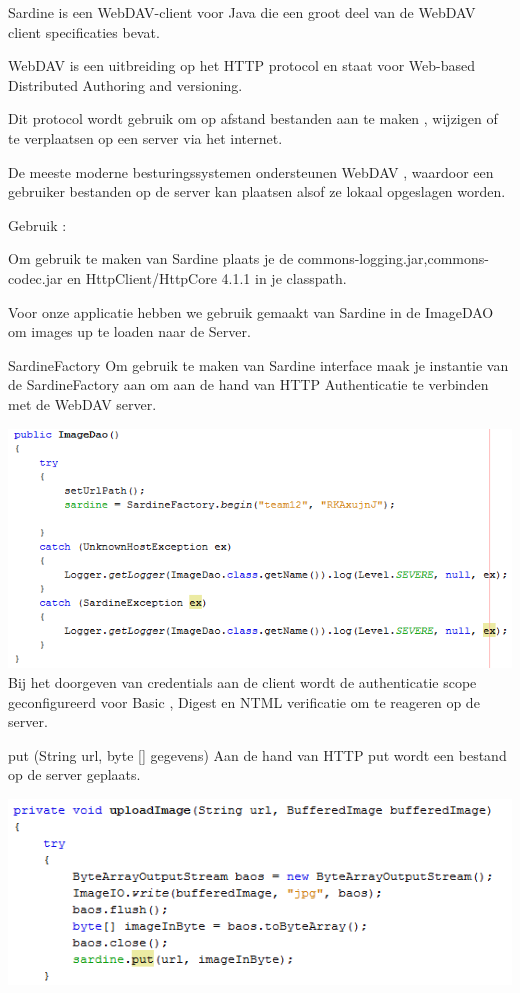 \documentclass[pdftex,a4paper,12pt,twoside]{report}
\begin{document}
Sardine is een WebDAV-client voor Java die een groot deel van de WebDAV client specificaties bevat. 

WebDAV is een uitbreiding op het HTTP protocol en staat voor Web-based Distributed Authoring and versioning.

Dit protocol wordt gebruik om op afstand bestanden aan te maken , wijzigen of te verplaatsen op een server via het internet.

De meeste moderne besturingssystemen ondersteunen WebDAV , waardoor een gebruiker bestanden op de server kan plaatsen alsof ze lokaal opgeslagen worden.

Gebruik :

Om gebruik te maken van Sardine plaats je de commons-logging.jar,commons-codec.jar en HttpClient/HttpCore 4.1.1 in je classpath.

Voor onze applicatie hebben we gebruik gemaakt van Sardine in de ImageDAO om images up te loaden naar de Server.


SardineFactory
Om gebruik te maken van Sardine interface maak je instantie van de SardineFactory aan om aan de hand van HTTP Authenticatie te verbinden met de WebDAV server.

\includegraphics{images/sardine.png}\\

Bij het doorgeven van credentials aan de client wordt de authenticatie scope geconfigureerd voor Basic , Digest en NTML verificatie om te reageren op de server.

put (String url, byte [] gegevens)
Aan de hand van HTTP put wordt een bestand op de server geplaats.

\includegraphics{images/sardineupload.png}\\
\end{document}
